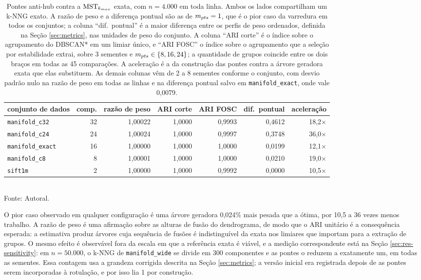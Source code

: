 \begin{table}[htb!]
\caption{\label{tab:bridges} Pontes anti-hub contra a $\mathrm{MST}_{k_{max}}$ exata, com $n = 4.000$ em toda linha. Ambos os lados compartilham um \ac{k-NNG} exato. A razão de peso e a diferença pontual são as de $m_{pts} = 1$, que é o pior caso da varredura em todos os conjuntos; a coluna ``dif.\ pontual'' é a maior diferença entre os perfis de peso ordenados, definida na Seção \ref{sec:metrics}, nas unidades de peso do conjunto. A coluna ``ARI corte'' é o índice sobre o agrupamento do DBSCAN* em um limiar único, e ``ARI FOSC'' o índice sobre o agrupamento que a seleção por estabilidade extrai, sobre 3 sementes e $m_{pts} \in \{8, 16, 24\}$; a quantidade de grupos coincide entre os dois braços em todas as 45 comparações. A aceleração é a da construção das pontes contra a árvore geradora exata que elas substituem. As demais colunas vêm de 2 a 8 sementes conforme o conjunto, com desvio padrão nulo na razão de peso em todas as linhas e na diferença pontual salvo em \texttt{manifold\_exact}, onde vale 0,0079.}
\centering
\footnotesize
\begin{tabular}{@{}lrrrrrr@{}}
\toprule
conjunto de dados & comp. & razão de peso & ARI corte & ARI FOSC & dif.\ pontual & aceleração \\
\midrule
\texttt{manifold\_c32}  & 32 & 1,00022 & 1,0000 & 0,9993 & 0,4612 & 18,2$\times$ \\
\texttt{manifold\_c24}  & 24 & 1,00024 & 1,0000 & 0,9997 & 0,3748 & 36,0$\times$ \\
\texttt{manifold\_exact}& 16 & 1,00000 & 1,0000 & 1,0000 & 0,0199 & 12,1$\times$ \\
\texttt{manifold\_c8}   & 8  & 1,00001 & 1,0000 & 1,0000 & 0,0210 & 19,0$\times$ \\
\texttt{sift1m}         & 2  & 1,00000 & 1,0000 & 0,9992 & 0,0000 & 10,5$\times$ \\
\bottomrule
\end{tabular}\\
Fonte: Autoral.
\end{table}

O pior caso observado em qualquer configuração é uma árvore geradora 0,024\% mais pesada que a ótima, por 10,5 a 36 vezes menos trabalho. A razão de peso é uma afirmação sobre as alturas de fusão do dendrograma, de modo que o \ac{ARI} unitário é a consequência esperada: a estimativa produz árvores cuja sequência de fusões é indistinguível da exata nos limiares que importam para a extração de grupos. O mesmo efeito é observável fora da escala em que a referência exata é viável, e a medição correspondente está na Seção \ref{sec:res-sensitivity}: em $n = 50.000$, o \ac{k-NNG} de \texttt{manifold\_wide} se divide em 300 componentes e as pontes o reduzem a exatamente um, em todas as sementes. Essa contagem usa a grandeza corrigida descrita na Seção \ref{sec:metrics}; a versão inicial era registrada depois de as pontes serem incorporadas à rotulação, e por isso lia 1 por construção.\\

